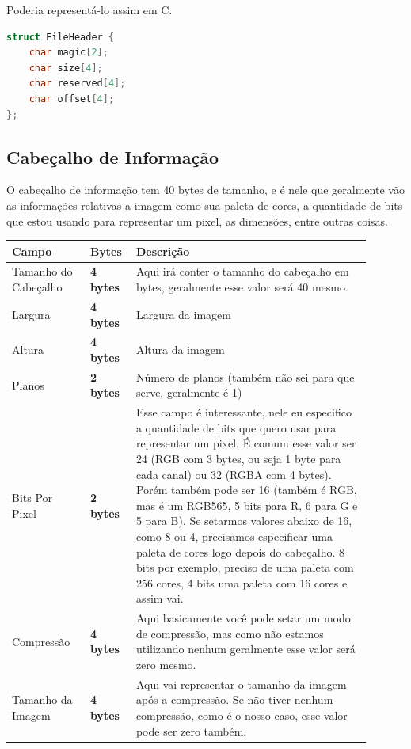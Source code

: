 \documentclass[a4paper,oneside,12pt]{article}
\begin{document}
Poderia representá-lo assim em C.
\begin{lstlisting}[language=C, caption=Cabeçalho de Arquivo em C]
struct FileHeader {
    char magic[2];
    char size[4];
    char reserved[4];
    char offset[4];
};
\end{lstlisting}

\subsection{Cabeçalho de Informação}

O cabeçalho de informação tem 40 bytes de tamanho, e é nele que geralmente vão as informações relativas a imagem como sua paleta de cores, a quantidade de bits que estou usando para representar um pixel, as dimensões, entre outras coisas.
\begin{center}
\begin{tabular}{|p{0.2\linewidth}|p{0.1\linewidth}|p{0.6\linewidth}|}
    \hline
    \textbf{Campo} & \textbf{Bytes} & \textbf{Descrição} \\
    \hline
    Tamanho do Cabeçalho & \textbf{4 bytes} & Aqui irá conter o tamanho do cabeçalho em bytes, geralmente esse valor será 40 mesmo.\\
    \hline
    Largura & \textbf{4 bytes} & Largura da imagem\\
    \hline
    Altura & \textbf{4 bytes} & Altura da imagem\\
    \hline
    Planos & \textbf{2 bytes} & Número de planos (também não sei para que serve, geralmente é 1)\\
    \hline
    Bits Por Pixel & \textbf{2 bytes} & Esse campo é interessante, nele eu especifico a quantidade de bits que quero usar para representar um pixel. É comum esse valor ser 24 (RGB com 3 bytes, ou seja 1 byte para cada canal) ou 32 (RGBA com 4 bytes). Porém também pode ser 16 (também é RGB, mas é um RGB565, 5 bits para R, 6 para G e 5 para B). Se setarmos valores abaixo de 16, como 8 ou 4, precisamos especificar uma paleta de cores logo depois do cabeçalho. 8 bits por exemplo, preciso de uma paleta com 256 cores, 4 bits uma paleta com 16 cores e assim vai.\\
    \hline
    Compressão & \textbf{4 bytes} & Aqui basicamente você pode setar um modo de compressão, mas como não estamos utilizando nenhum geralmente esse valor será zero mesmo.\\
    \hline
    Tamanho da Imagem & \textbf{4 bytes} & Aqui vai representar o tamanho da imagem após a compressão. Se não tiver nenhum compressão, como é o nosso caso, esse valor pode ser zero também.\\
    \hline
    
\end{tabular}
\end{center}
\end{document}
